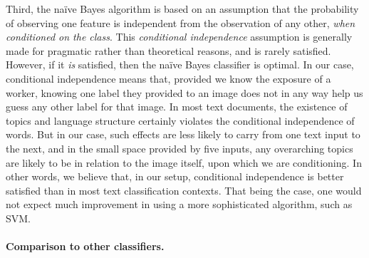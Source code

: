 \documentclass[12pt]{article}
\begin{document}
Third, the na\"ive Bayes algorithm is based on an assumption that the 
probability of observing one feature is independent from the observation
of any other, \textit{when conditioned on the class}.  This
\textit{conditional independence} assumption is generally made for
pragmatic rather than theoretical reasons, and is rarely satisfied.  However,
if it \textit{is} satisfied, then the na\"ive Bayes classifier is optimal.
In our case, conditional independence means that, provided we know the 
exposure of a worker, knowing one label they provided to an image does
not in any way help us guess any other label for that image.  In most
text documents, the existence of topics and language structure certainly
violates the conditional independence of words.  But in our case, such 
effects are less likely to carry from one text input to the next, and in the
small space provided by five inputs, any overarching topics are likely to
be in relation to the image itself, upon which we are conditioning.  In other
words, we believe that, in our setup, conditional independence is better 
satisfied than in most text classification contexts.  That being the case,
one would not expect much improvement in using a more sophisticated algorithm,
such as SVM.

\paragraph{Comparison to other classifiers.} 
\end{document}

